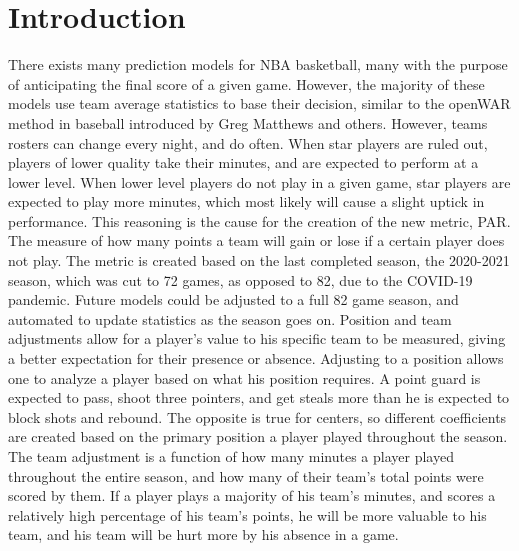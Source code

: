 \documentclass[12pt]{article}
\begin{document}
\section{Introduction}
There exists many prediction models for NBA basketball, many with the purpose of anticipating the final 
score of a given game. However, the majority of these models use team average statistics to base their 
decision, similar to the openWAR method in baseball introduced by Greg Matthews and others. However, 
teams rosters can change every night, and do often. When star players are ruled out, players of lower 
quality take their minutes, and are expected to perform at a lower level. When lower level players do not 
play in a given game, star players are expected to play more minutes, which most likely will cause a slight 
uptick in performance. This reasoning is the cause for the creation of the new metric, PAR. The measure of 
how many points a team will gain or lose if a certain player does not play. The metric is created based on 
the last completed season, the 2020-2021 season, which was cut to 72 games, as opposed to 82, due to 
the COVID-19 pandemic. Future models could be adjusted to a full 82 game season, and automated to 
update statistics as the season goes on. Position and team adjustments allow for a player's value to his 
specific team to be measured, giving a better expectation for their presence or absence. Adjusting to a 
position allows one to analyze a player based on what his position requires. A point guard is expected to 
pass, shoot three pointers, and get steals more than he is expected to block shots and rebound. The 
opposite is true for centers, so different coefficients are created based on the primary position a player 
played throughout the season. The team adjustment is a function of how many minutes a player played 
throughout the entire season, and how many of their team's total points were scored by them. If a player 
plays a majority of his team's minutes, and scores a relatively high percentage of his team's points, he will 
be more valuable to his team, and his team will be hurt more by his absence in a game.
\end{document}
